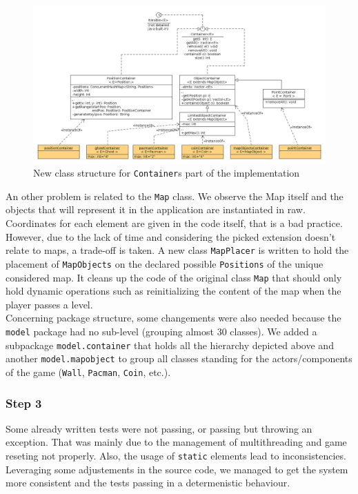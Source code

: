 \documentclass[]{article}
\begin{document}
\begin{figure}[h]
\centering
\includegraphics[width=\linewidth]{S2-classdiagram_containers}
\caption{New class structure for \texttt{Container}s part of the implementation}
\label{fig:S2_containers}
\end{figure}


An other problem is related to the \texttt{Map} class. We observe the Map itself and the objects that will represent it in the application are instantiated in raw. Coordinates for each element are given in the code itself, that is a bad practice. However, due to the lack of time and considering the picked extension doesn't relate to maps, a trade-off is taken. A new class \texttt{MapPlacer} is written to hold the placement of \texttt{MapObjects} on the declared possible \texttt{Positions} of the unique considered map. It cleans up the code of the original class \texttt{Map} that should only hold dynamic operations such as reinitializing the content of the map when the player passes a level.\\

Concerning package structure, some changements were also needed because the \texttt{model} package had no sub-level (grouping almost 30 classes). We added a subpackage \texttt{model.container} that holds all the hierarchy depicted above and another \texttt{model.mapobject} to group all classes standing for the actors/components of the game (\texttt{Wall}, \texttt{Pacman}, \texttt{Coin}, etc.).

\subsubsection{Step 3}

\indent Some already written tests were not passing, or passing but throwing an exception. That was mainly due to the management of multithreading and game reseting not properly. Also, the usage of \texttt{static} elements lead to inconsistencies. Leveraging some adjustements in the source code, we managed to get the system more consistent and the tests passing in a determenistic behaviour.
\end{document}
